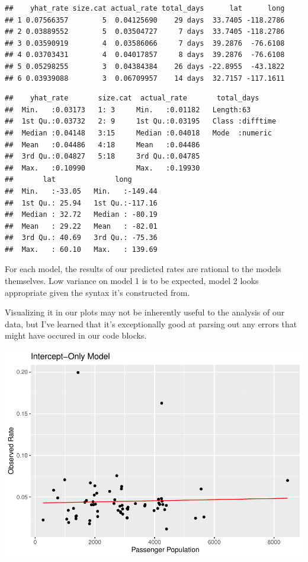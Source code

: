 \documentclass[
  11,
]{book}
\begin{document}
\begin{verbatim}
##    yhat_rate size.cat actual_rate total_days      lat      long
## 1 0.07566357        5  0.04125690    29 days  33.7405 -118.2786
## 2 0.03889552        5  0.03504727     7 days  33.7405 -118.2786
## 3 0.03590919        4  0.03586066     7 days  39.2876  -76.6108
## 4 0.03703431        4  0.04017857     8 days  39.2876  -76.6108
## 5 0.05298255        3  0.04384384    26 days -22.8955  -43.1822
## 6 0.03939088        3  0.06709957    14 days  32.7157 -117.1611
\end{verbatim}

\begin{verbatim}
##    yhat_rate       size.cat  actual_rate       total_days      
##  Min.   :0.03173   1: 3     Min.   :0.01182   Length:63        
##  1st Qu.:0.03732   2: 9     1st Qu.:0.03195   Class :difftime  
##  Median :0.04148   3:15     Median :0.04018   Mode  :numeric   
##  Mean   :0.04486   4:18     Mean   :0.04486                    
##  3rd Qu.:0.04827   5:18     3rd Qu.:0.04785                    
##  Max.   :0.10990            Max.   :0.19930                    
##       lat              long        
##  Min.   :-33.05   Min.   :-149.44  
##  1st Qu.: 25.94   1st Qu.:-117.16  
##  Median : 32.72   Median : -80.19  
##  Mean   : 29.22   Mean   : -82.01  
##  3rd Qu.: 40.69   3rd Qu.: -75.36  
##  Max.   : 60.10   Max.   : 139.69
\end{verbatim}

For each model, the results of our predicted rates are rational to the models themselves. Low variance on model 1 is to be expected, model 2 looks appropriate given the syntax it's constructed from.

Visualizing it in our plots may not be inherently useful to the analysis of our data, but I've learned that it's exceptionally good at parsing out any errors that might have occured in our code blocks.

\includegraphics{_main_files/figure-latex/predm1_plot2-1.pdf}
\end{document}
